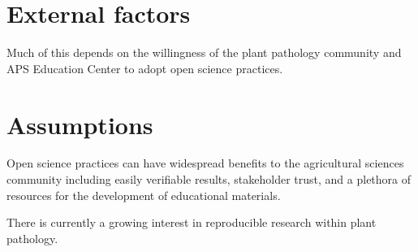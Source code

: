 \documentclass[12pt,letterpaper]{article}
\begin{document}
\section{External factors}


Much of this depends on the willingness of the plant pathology community and APS Education Center to adopt open science practices. 

\section{Assumptions}


Open science practices can have widespread benefits to the agricultural sciences community including easily verifiable results, stakeholder trust, and a plethora of resources for the development of educational materials. 

There is currently a growing interest in reproducible research within plant pathology.
\end{document}
